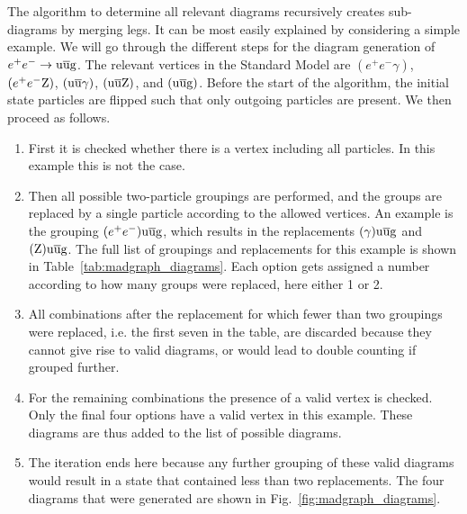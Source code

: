 The algorithm to determine all relevant diagrams recursively creates sub-diagrams by merging legs.
It can be most easily explained by considering a simple example. We will go through the different
steps for the diagram generation of $e^+ e^- \rightarrow \mathrm{u} \overline{\mathrm{u}} \mathrm{g}$. The relevant vertices
in the Standard Model are $(e^+ e^- \gamma)$, $(e^+ e^- \mathrm{Z})$, $(\mathrm{u} \overline{\mathrm{u}} \gamma)$, $(\mathrm{u}
\overline{\mathrm{u}} \mathrm{Z})$, and $(\mathrm{u} \overline{\mathrm{u}} \mathrm{g})$. Before the start of the algorithm, the initial state
particles are flipped such that only outgoing particles are present. We then proceed as follows.
\begin{enumerate}
  \item  First it is checked whether there is a vertex including all particles. In this example
this is not the case. 
  \item Then all possible two-particle groupings are performed, and the groups are replaced by a
single particle according to the allowed vertices. An example is the grouping $(e^+ e^-) \mathrm{u}
\overline{\mathrm{u}} \mathrm{g}$, which results in the replacements $(\gamma) \mathrm{u} \overline{\mathrm{u}} \mathrm{g}$ and $(\mathrm{Z}) \mathrm{u}
\overline{\mathrm{u}} \mathrm{g}$. The full list of groupings and replacements for this example is shown in
Table~\ref{tab:madgraph_diagrams}. Each option gets assigned a number according to how many groups
were replaced, here either 1 or 2. 
  \item All combinations after the replacement for which fewer than two groupings were replaced,
i.e. the first seven in the table, are discarded because they cannot give rise to valid diagrams, or
would lead to double counting if grouped further. 
  \item For the remaining combinations the presence of a valid vertex is checked. Only the final
four options have a valid vertex in this example. These diagrams are thus added to the list of
possible diagrams. 
  \item The iteration ends here because any further grouping of these valid diagrams would result
in a state that contained less than two replacements. The four diagrams that were generated are
shown in Fig.~\ref{fig:madgraph_diagrams}.
\end{enumerate}

